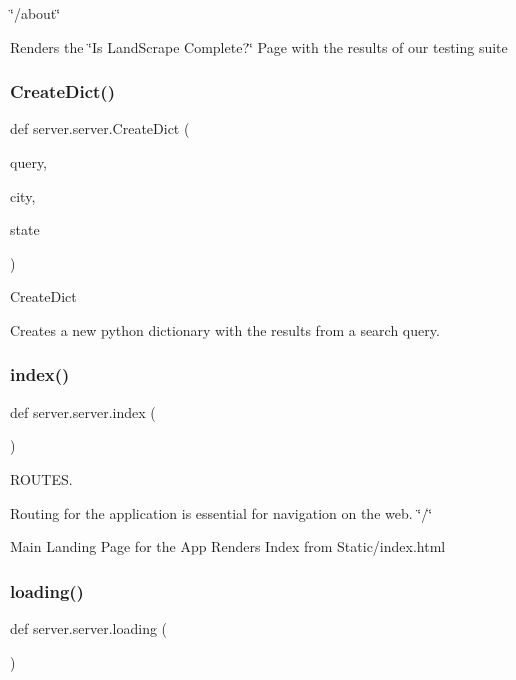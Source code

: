 \char`\"{}/about\char`\"{} 

Renders the \char`\"{}\+Is Land\+Scrape Complete?\char`\"{} Page with the results of our testing suite \mbox{\label{namespaceserver_1_1server_a5a8e8748bfecc019464dddba22dec54d}} 
\subsubsection{\texorpdfstring{Create\+Dict()}{CreateDict()}}
{\footnotesize\ttfamily def server.\+server.\+Create\+Dict (\begin{DoxyParamCaption}\item[{}]{query,  }\item[{}]{city,  }\item[{}]{state }\end{DoxyParamCaption})}



Create\+Dict 

Creates a new python dictionary with the results from a search query. \mbox{\label{namespaceserver_1_1server_ab3d96b92729f42de2866e0cb876a0a71}} 
\subsubsection{\texorpdfstring{index()}{index()}}
{\footnotesize\ttfamily def server.\+server.\+index (\begin{DoxyParamCaption}{ }\end{DoxyParamCaption})}



R\+O\+U\+T\+ES. 

Routing for the application is essential for navigation on the web.  \char`\"{}/\char`\"{}

Main Landing Page for the App Renders Index from Static/index.\+html \mbox{\label{namespaceserver_1_1server_a577541b22116afba4cb2125f1597ae79}} 
\subsubsection{\texorpdfstring{loading()}{loading()}}
{\footnotesize\ttfamily def server.\+server.\+loading (\begin{DoxyParamCaption}{ }\end{DoxyParamCaption})}

